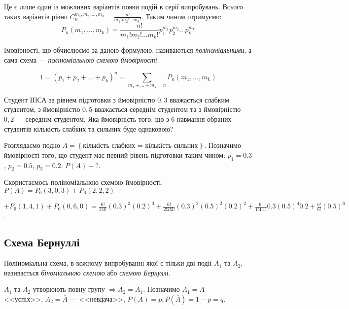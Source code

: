 Це є лише один із можливих варіантів появи подій в серії випробувань. Всього таких варіантів 
рівно $C_n^{m_1, m_2, \dots, m_k} = \frac{n!}{m_1!m_2! \dots m_k!}$. Таким чином отримуємо:
\begin{equation}
    P_n(m_1, \dots, m_k) = \frac{n!}{m_1!m_2! \dots m_k!} p_1^{m_1} p_2^{m_2} \dots p_k^{m_k}
\end{equation}
\begin{definition}
    Імовірності, що обчислюємо за даною формулою, називаються \emph{поліноміальними}, а 
    сама схема --- \emph{поліноміальною схемою ймовірності}. 
\end{definition}
\begin{remark}
    $$1 = (p_1 + p_2 + \dots + p_k)^n = \sum_{m_1 + \dots + m_k = n} P_n(m_1, \dots, m_k)$$
\end{remark}
\begin{example}
    Студент ІПСА за рівнем підготовки з ймовірністю $0,3$ вважається слабким студентом, 
    з ймовірністю $0,5$ вважається середнім студентом та 
    з ймовірністю $0,2$ --- середнім студентом. Яка ймовірність того, що з 6 навмання 
    обраних студентів кількість слабких та сильних буде однаковою?

    Розглядаємо подію $A = \left\{\text{кількість слабких = кількість сильних}\right\}$. 
    Позначимо ймовірності того, що студент має певний рівень підготовки таким чином:
    $p_1 = 0.3$, $p_2 = 0.5$, $p_3 = 0.2$.
    $P(A)-?$.

    Скористаємось поліноміальною схемою ймовірності:
    $P(A) = P_6(3, 0, 3) + P_6(2, 2, 2) +$

    $+ P_6(1, 4, 1) + P_6(0, 6, 0) = 
    \frac{6!}{3!3!}(0.3)^3 (0.2)^3 + \frac{6!}{2!2!2!}(0.3)^2 (0.5)^2 (0.2)^2 + 
    \frac{6!}{1!4!1!}0.3 (0.5)^4 0.2 + \frac{6!}{6!} (0.5)^6$.
\end{example}
\subsection{Схема Бернуллі}
\begin{definition}
    Поліноміальна схема, в кожному випробуванні якої є тільки дві події $A_1$ та $A_2$, 
    називається \emph{біноміальною схемою} або \emph{схемою Бернуллі}.
\end{definition}

$A_1$ та $A_2$ утворюють повну групу $\Rightarrow A_2 = \overline{A_1}$.
Позначимо $A_1 = A$ --- <<успіх>>, $A_2 = \overline{A}$ --- <<невдача>>, 
$P(A) = p, P(\overline{A}) = 1-p = q$.

